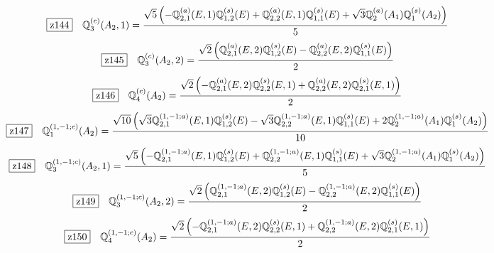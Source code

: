 \documentclass[fleqn,10pt,landscape]{jsarticle}
\begin{document}
\begin{dmath*}
\hspace*{3mm}\fbox{z144}\quad \mathbb{Q}_{3}^{(c)}(A_{2},1)=\frac{\sqrt{5} \left(- \mathbb{Q}_{2,1}^{(a)}(E,1) \mathbb{Q}_{1,2}^{(s)}(E) + \mathbb{Q}_{2,2}^{(a)}(E,1) \mathbb{Q}_{1,1}^{(s)}(E) + \sqrt{3} \mathbb{Q}_{2}^{(a)}(A_{1}) \mathbb{Q}_{1}^{(s)}(A_{2})\right)}{5}
\end{dmath*}
\begin{dmath*}
\hspace*{3mm}\fbox{z145}\quad \mathbb{Q}_{3}^{(c)}(A_{2},2)=\frac{\sqrt{2} \left(\mathbb{Q}_{2,1}^{(a)}(E,2) \mathbb{Q}_{1,2}^{(s)}(E) - \mathbb{Q}_{2,2}^{(a)}(E,2) \mathbb{Q}_{1,1}^{(s)}(E)\right)}{2}
\end{dmath*}
\begin{dmath*}
\hspace*{3mm}\fbox{z146}\quad \mathbb{Q}_{4}^{(c)}(A_{2})=\frac{\sqrt{2} \left(- \mathbb{Q}_{2,1}^{(a)}(E,2) \mathbb{Q}_{2,2}^{(s)}(E,1) + \mathbb{Q}_{2,2}^{(a)}(E,2) \mathbb{Q}_{2,1}^{(s)}(E,1)\right)}{2}
\end{dmath*}
\begin{dmath*}
\hspace*{3mm}\fbox{z147}\quad \mathbb{Q}_{1}^{(1,-1;c)}(A_{2})=\frac{\sqrt{10} \left(\sqrt{3} \mathbb{Q}_{2,1}^{(1,-1;a)}(E,1) \mathbb{Q}_{1,2}^{(s)}(E) - \sqrt{3} \mathbb{Q}_{2,2}^{(1,-1;a)}(E,1) \mathbb{Q}_{1,1}^{(s)}(E) + 2 \mathbb{Q}_{2}^{(1,-1;a)}(A_{1}) \mathbb{Q}_{1}^{(s)}(A_{2})\right)}{10}
\end{dmath*}
\begin{dmath*}
\hspace*{3mm}\fbox{z148}\quad \mathbb{Q}_{3}^{(1,-1;c)}(A_{2},1)=\frac{\sqrt{5} \left(- \mathbb{Q}_{2,1}^{(1,-1;a)}(E,1) \mathbb{Q}_{1,2}^{(s)}(E) + \mathbb{Q}_{2,2}^{(1,-1;a)}(E,1) \mathbb{Q}_{1,1}^{(s)}(E) + \sqrt{3} \mathbb{Q}_{2}^{(1,-1;a)}(A_{1}) \mathbb{Q}_{1}^{(s)}(A_{2})\right)}{5}
\end{dmath*}
\begin{dmath*}
\hspace*{3mm}\fbox{z149}\quad \mathbb{Q}_{3}^{(1,-1;c)}(A_{2},2)=\frac{\sqrt{2} \left(\mathbb{Q}_{2,1}^{(1,-1;a)}(E,2) \mathbb{Q}_{1,2}^{(s)}(E) - \mathbb{Q}_{2,2}^{(1,-1;a)}(E,2) \mathbb{Q}_{1,1}^{(s)}(E)\right)}{2}
\end{dmath*}
\begin{dmath*}
\hspace*{3mm}\fbox{z150}\quad \mathbb{Q}_{4}^{(1,-1;c)}(A_{2})=\frac{\sqrt{2} \left(- \mathbb{Q}_{2,1}^{(1,-1;a)}(E,2) \mathbb{Q}_{2,2}^{(s)}(E,1) + \mathbb{Q}_{2,2}^{(1,-1;a)}(E,2) \mathbb{Q}_{2,1}^{(s)}(E,1)\right)}{2}
\end{dmath*}
\end{document}
